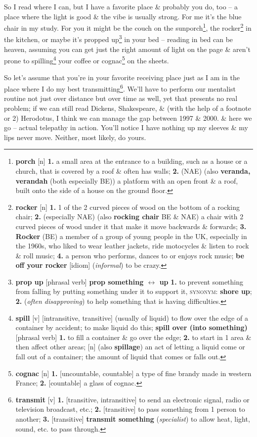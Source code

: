 \documentclass[oneside]{book}
\numberwithin{equation}{section}
\begin{document}
So I read where I can, but I have a favorite place \& probably you do, too -- a place where the light is good \& the vibe is usually strong. For me it's the blue chair in my study. For you it might be the couch on the sunporch\footnote{\textbf{porch} [n] \textbf{1.} a small area at the entrance to a building, such as a house or a church, that is covered by a roof \& often has walls; \textbf{2.} (NAE) (also \textbf{veranda, verandah} (both especially BE)) a platform with an open front \& a roof, built onto the side of a house on the ground floor.}, the rocker\footnote{\textbf{rocker} [n] \textbf{1.} 1 of the 2 curved pieces of wood on the bottom of a rocking chair; \textbf{2.} (especially NAE) (also \textbf{rocking chair} BE \& NAE) a chair with 2 curved pieces of wood under it that make it move backwards \& forwards; \textbf{3.} \textbf{Rocker} (BE) a member of a group of young people in the UK, especially in the 1960s, who liked to wear leather jackets, ride motocycles \& listen to rock \& roll music; \textbf{4.} a person who performs, dances to or enjoys rock music; \textbf{be off your rocker} [idiom] (\textit{informal}) to be crazy.} in the kitchen, or maybe it's propped up\footnote{\textbf{prop up} [phrasal verb] \textbf{prop something $\leftrightarrow$ up} \textbf{1.} to prevent something from falling by putting something under it to support it, \textsc{synonym}: \textbf{shore up}; \textbf{2.} (\textit{often disapproving}) to help something that is having difficulties.} in your bed -- reading in bed can be heaven, assuming you can get just the right amount of light on the page \& aren't prone to spilling\footnote{\textbf{spill} [v] [intransitive, transitive] (usually of liquid) to flow over the edge of a container by accident; to make liquid do this; \textbf{spill over (into something)} [phrasal verb] \textbf{1.} to fill a container \& go over the edge; \textbf{2.} to start in 1 area \& then affect other areas; [n] (also \textbf{spillage}) an act of letting a liquid come or fall out of a container; the amount of liquid that comes or falls out.} your coffee or cognac\footnote{\textbf{cognac} [n] \textbf{1.} [uncountable, countable] a type of fine brandy made in western France; \textbf{2.} [countable] a glass of cognac.} on the sheets.

So let's assume that you're in your favorite receiving place just as I am in the place where I do my best transmitting\footnote{\textbf{transmit} [v] \textbf{1.} [transitive, intransitive] to send an electronic signal, radio or television broadcast, etc.; \textbf{2.} [transitive] to pass something from 1 person to another; \textbf{3.} [transitive] \textbf{transmit something} (\textit{specialist}) to allow heat, light, sound, etc. to pass through.}. We'll have to perform our mentalist routine not just over distance but over time as well, yet that presents no real problem; if we can still read Dickens, Shakespeare, \& (with the help of a footnote or 2) Herodotus, I think we can manage the gap between 1997 \& 2000. \& here we go -- actual telepathy in action. You'll notice I have nothing up my sleeves \& my lips never move. Neither, most likely, do yours.
\end{document}
